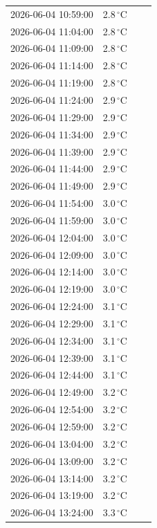 \documentclass[UTF8,10pt,a4paper,fontset=fandol]{ctexart}
\begin{document}
\begin{flushleft}
\begin{tabular}{|p{3.35cm}|p{1.05cm}|p{3.35cm}|p{1.05cm}|}
2026-06-04 10:59:00 & 2.8\,${}^{\circ}$C & &\\
2026-06-04 11:04:00 & 2.8\,${}^{\circ}$C & &\\
2026-06-04 11:09:00 & 2.8\,${}^{\circ}$C & &\\
2026-06-04 11:14:00 & 2.8\,${}^{\circ}$C & &\\
2026-06-04 11:19:00 & 2.8\,${}^{\circ}$C & &\\
2026-06-04 11:24:00 & 2.9\,${}^{\circ}$C & &\\
2026-06-04 11:29:00 & 2.9\,${}^{\circ}$C & &\\
2026-06-04 11:34:00 & 2.9\,${}^{\circ}$C & &\\
2026-06-04 11:39:00 & 2.9\,${}^{\circ}$C & &\\
2026-06-04 11:44:00 & 2.9\,${}^{\circ}$C & &\\
2026-06-04 11:49:00 & 2.9\,${}^{\circ}$C & &\\
2026-06-04 11:54:00 & 3.0\,${}^{\circ}$C & &\\
2026-06-04 11:59:00 & 3.0\,${}^{\circ}$C & &\\
2026-06-04 12:04:00 & 3.0\,${}^{\circ}$C & &\\
2026-06-04 12:09:00 & 3.0\,${}^{\circ}$C & &\\
2026-06-04 12:14:00 & 3.0\,${}^{\circ}$C & &\\
2026-06-04 12:19:00 & 3.0\,${}^{\circ}$C & &\\
2026-06-04 12:24:00 & 3.1\,${}^{\circ}$C & &\\
2026-06-04 12:29:00 & 3.1\,${}^{\circ}$C & &\\
2026-06-04 12:34:00 & 3.1\,${}^{\circ}$C & &\\
2026-06-04 12:39:00 & 3.1\,${}^{\circ}$C & &\\
2026-06-04 12:44:00 & 3.1\,${}^{\circ}$C & &\\
2026-06-04 12:49:00 & 3.2\,${}^{\circ}$C & &\\
2026-06-04 12:54:00 & 3.2\,${}^{\circ}$C & &\\
2026-06-04 12:59:00 & 3.2\,${}^{\circ}$C & &\\
2026-06-04 13:04:00 & 3.2\,${}^{\circ}$C & &\\
2026-06-04 13:09:00 & 3.2\,${}^{\circ}$C & &\\
2026-06-04 13:14:00 & 3.2\,${}^{\circ}$C & &\\
2026-06-04 13:19:00 & 3.2\,${}^{\circ}$C & &\\
2026-06-04 13:24:00 & 3.3\,${}^{\circ}$C & &\\

\end{tabular}
\end{flushleft}
\end{document}
